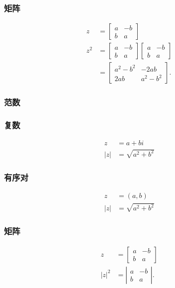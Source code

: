 \subsubsection*{矩阵}

$$
\begin{aligned}
z & =\left[\begin{array}{cc}
a & -b \\
b & a
\end{array}\right] \\
z^{2} & =\left[\begin{array}{cc}
a & -b \\
b & a
\end{array}\right]\left[\begin{array}{cc}
a & -b \\
b & a
\end{array}\right] \\
& =\left[\begin{array}{cc}
a^{2}-b^{2} & -2 a b \\
2 a b & a^{2}-b^{2}
\end{array}\right] .
\end{aligned}
$$

\subsubsection{范数}

\subsubsection*{复数}

$$
\begin{aligned}
z & =a+b i \\
|z| & =\sqrt{a^{2}+b^{2}}
\end{aligned}
$$

\subsubsection*{有序对}
$$
\begin{aligned}
z & =(a, b) \\
|z| & =\sqrt{a^{2}+b^{2}}
\end{aligned}
$$

\subsubsection*{矩阵}
$$
\begin{aligned}
z & =\left[\begin{array}{cc}
a & -b \\
b & a
\end{array}\right] \\
|z|^{2} & =\left|\begin{array}{cc}
a & -b \\
b & a
\end{array}\right| .
\end{aligned}
$$

